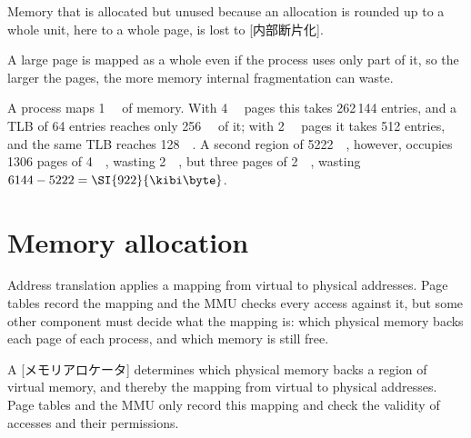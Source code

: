 \documentclass[../main.tex]{subfiles}
\begin{document}
\begin{definition}
  Memory that is allocated but unused because an allocation is rounded up
  to a whole unit, here to a whole page, is lost to
  [内部断片化].
\end{definition}

A large page is mapped as a whole even if the process uses only part of it,
so the larger the pages, the more memory internal fragmentation can
waste.

\begin{example}
  A process maps \SI{1}{\gibi\byte} of memory.  With \SI{4}{\kibi\byte}
  pages this takes 262\,144 entries, and a TLB of 64 entries reaches only
  \SI{256}{\kibi\byte} of it; with \SI{2}{\mebi\byte} pages it takes 512
  entries, and the same TLB reaches \SI{128}{\mebi\byte}.  A second region
  of \SI{5222}{\kibi\byte}, however, occupies 1306 pages of \SI{4}{\kibi\byte}, wasting
  \SI{2}{\kibi\byte}, but three pages of \SI{2}{\mebi\byte}, wasting
  $6144 - 5222 = \SI{922}{\kibi\byte}$.
\end{example}

\section{Memory allocation}
\label{sec:l08-allocation}

Address translation applies a mapping from virtual to physical
addresses.  Page tables record the
mapping and the MMU checks every access against it, but some other
component must decide what the mapping is: which physical memory backs each
page of each process, and which memory is still free.

\begin{definition}
  A [メモリアロケータ] determines which physical
  memory backs a region of virtual memory, and thereby the mapping from
  virtual to physical addresses.  Page tables and the MMU only record this
  mapping and check the validity of accesses and their permissions.
\end{definition}
\end{document}

